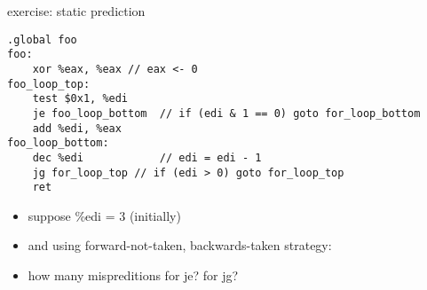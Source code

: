 \begin{frame}[fragile,label=staticPredictEx]{exercise: static prediction}
\begin{lstlisting}[language=myasm,style=smaller]
.global foo
foo:
    xor %eax, %eax // eax <- 0
foo_loop_top:
    test $0x1, %edi
    je foo_loop_bottom  // if (edi & 1 == 0) goto for_loop_bottom
    add %edi, %eax 
foo_loop_bottom:
    dec %edi            // edi = edi - 1
    jg for_loop_top // if (edi > 0) goto for_loop_top
    ret
\end{lstlisting}
\begin{itemize}
\item suppose \%edi = 3 (initially)
\item and using forward-not-taken, backwards-taken strategy:
\item how many mispreditions for je? for jg?
\end{itemize}
\end{frame}
